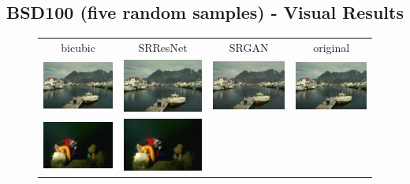 \documentclass[10pt,twocolumn,letterpaper]{article}
\begin{document}
\subsection{BSD100 (five random samples) - Visual Results}
\label{app:BSD100}
\begin{figure}[h!]
\begin{tabular}{cccc}
bicubic & SRResNet & SRGAN & original \\
\includegraphics[width=1.5in]{images/used/appendix/jpg/BSD100/219090_bicubic}&
\includegraphics[width=1.5in]{images/used/appendix/jpg/BSD100/219090_SRResNet-MSE} &
\includegraphics[width=1.5in]{images/used/appendix/jpg/BSD100/219090_SRGAN-VGG54} &
\includegraphics[width=1.5in]{images/used/appendix/jpg/BSD100/219090_HR} \\
\includegraphics[width=1.5in]{images/used/appendix/jpg/BSD100/45096_bicubic}&
\includegraphics[width=1.5in]{images/used/appendix/jpg/BSD100/45096_SRResNet-MSE} &

\end{tabular}
\end{figure}
\end{document}
